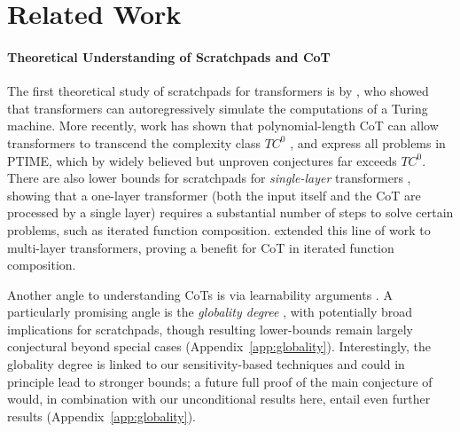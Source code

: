 \section{Related Work}
\paragraph{Theoretical Understanding of Scratchpads and CoT}
The first theoretical study of scratchpads for transformers is by \citet{perez2019turing}, who showed that transformers can autoregressively simulate the computations of a Turing machine. %
More recently, work has shown that polynomial-length CoT can allow transformers to transcend the complexity class $TC^0$ \citep{feng2023towards, merrill2023expresssive, li2024chain}, and express all problems in PTIME, which by widely believed but unproven conjectures far exceeds $TC^0$.
There are also lower bounds for scratchpads  for \emph{single-layer} transformers \cite{peng2024limitations,barcelo2025ehrenfeucht}, showing that a one-layer transformer (both the input itself and the CoT are processed by a single layer) requires a substantial number of steps to solve certain problems, such as iterated function composition.
\citet{chen2024theoretical} extended this line of work to multi-layer transformers, proving a benefit for CoT in iterated function composition.



Another angle to understanding CoTs is via learnability arguments \citep{wies2022sub,kim2024transformers,hahn2023theory,abbe2024how}.
%
A particularly promising angle is the \emph{globality degree} \cite{abbe2024how}, with potentially broad implications for scratchpads, though resulting lower-bounds remain largely conjectural beyond special cases (Appendix~\ref{app:globality}).
Interestingly, the globality degree is linked to our sensitivity-based techniques and could in principle lead to stronger bounds; a future full proof of the main conjecture of \citet{abbe2024how} would, in combination with our unconditional results here, entail even further results (Appendix~\ref{app:globality}).

%
%
%

